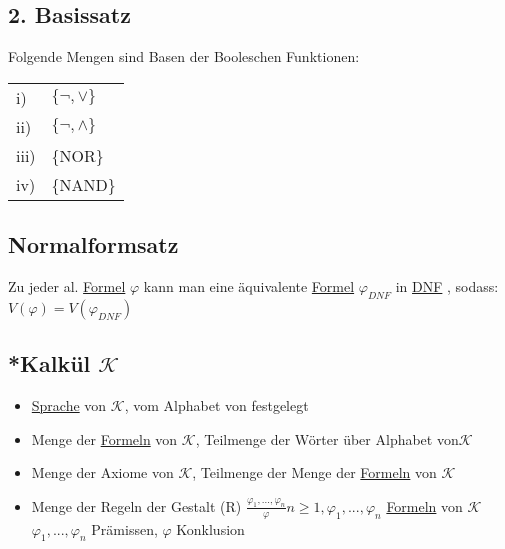 \documentclass[12pt,a4paper]{article} %
\begin{document}
	\subsection{2. Basissatz}
	Folgende Mengen sind Basen der Booleschen Funktionen: \newline
	\begin{tabular}{l l}
		i) & $\{\neg, \lor\}$ \\
		ii) & $\{\neg, \land\}$ \\
		iii) & \{NOR\} \\
		iv) & \{NAND\}
	\end{tabular}
	
	\subsection{Normalformsatz}
	Zu jeder al. \hyperref[Formel]{Formel} $\varphi$ kann man eine äquivalente \hyperref[Formel]{Formel} $\varphi_{DNF}$ in \hyperref[DNF]{DNF} , sodass: $V(\varphi) = V(\varphi_{DNF})$
	
	\subsection{*Kalkül $\mathcal{K}$}
	\begin{itemize}
		\item \hyperref[ALSprache]{Sprache} von $\mathcal{K}$, vom Alphabet von festgelegt 
		\item Menge der \hyperref[Formel]{Formeln} von $\mathcal{K}$, Teilmenge der Wörter über Alphabet von$\mathcal{K}$
		\item Menge der Axiome von $\mathcal{K}$, Teilmenge der Menge der \hyperref[Formel]{Formeln} von $\mathcal{K}$
		\item Menge der Regeln der Gestalt \newline
		(R) $\frac{\varphi_1, ..., \varphi_n}{\varphi} n \ge 1, \varphi_1, ..., \varphi_n$ \hyperref[Formel]{Formeln} von $\mathcal{K}$\newline
		$\varphi_1, ..., \varphi_n$ Prämissen, $\varphi$ Konklusion
	\end{itemize}
\end{document}
